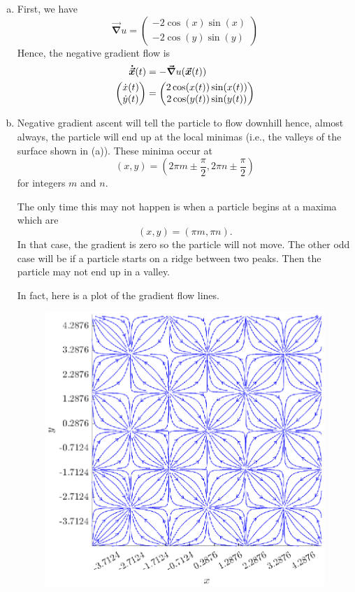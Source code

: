 \documentclass[12pt]{article} %
\newcommand{\grad}{\boldsymbol{\vec{\nabla}}}
\newcommand{\vecxdot}{\boldsymbol{\dot{\vec{x}}}}
\begin{document}
\begin{solution}
\begin{enumerate}[(a)]
\begin{figure}[H]
\begin{subfigure}[b]{0.45\textwidth}
            \caption{Level curves to $u(x,y)$.}
        \end{subfigure}
\end{figure}
\item First, we have
\[
\grad u = \begin{pmatrix} -2 \cos(x)\sin(x)\\ -2 \cos(y)\sin(y) \end{pmatrix}
\]
Hence, the negative gradient flow is
\begin{align*}
	\vecxdot(t) &= - \grad u(\vecx(t))\\
	\begin{pmatrix} \dot{x}(t) \\ \dot{y}(t)\end{pmatrix} &= \begin{pmatrix} 2 \cos(x(t))\sin(x(t))\\ 2 \cos(y(t))\sin(y(t)) \end{pmatrix}
\end{align*}

\item Negative gradient ascent will tell the particle to flow downhill hence, almost always, the particle will end up at the local minimas (i.e., the valleys of the surface shown in (a)). These minima occur at
\[
(x,y)=\left( 2\pi m \pm \frac{\pi}{2}, 2 \pi n \pm \frac{\pi}{2} \right)
\]
for integers $m$ and $n$. 

The only time this may not happen is when a particle begins at a maxima which are
\[
(x,y)=\left( \pi m , \pi n \right).
\]
In that case, the gradient is zero so the particle will not move. The other odd case will be if a particle starts on a ridge between two peaks. Then the particle may not end up in a valley. 

In fact, here is a plot of the gradient flow lines.
\begin{figure}[H]
	\centering
	\includegraphics[width=.75\textwidth]{figures/gradient_flow}
\end{figure}


\end{enumerate}
\end{solution}
\end{document}
